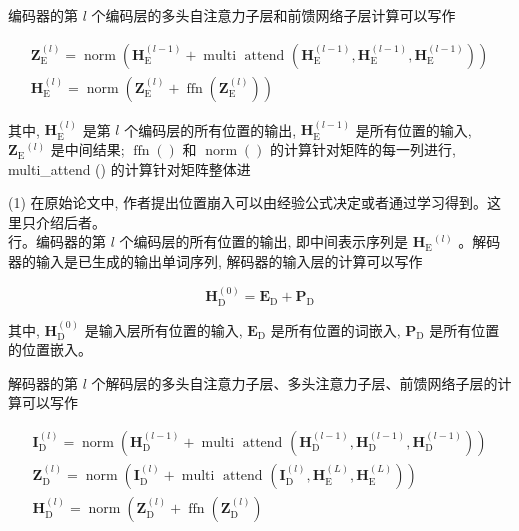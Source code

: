 \documentclass[10pt]{article}
\begin{document}
编码器的第 $l$ 个编码层的多头自注意力子层和前馈网络子层计算可以写作


\begin{gather*}
\boldsymbol{Z}_{\mathrm{E}}^{(l)}=\operatorname{norm}\left(\boldsymbol{H}_{\mathrm{E}}^{(l-1)}+\operatorname{multi} \text { attend }\left(\boldsymbol{H}_{\mathrm{E}}^{(l-1)}, \boldsymbol{H}_{\mathrm{E}}^{(l-1)}, \boldsymbol{H}_{\mathrm{E}}^{(l-1)}\right)\right)  \tag{26.32}\\
\boldsymbol{H}_{\mathrm{E}}^{(l)}=\operatorname{norm}\left(\boldsymbol{Z}_{\mathrm{E}}^{(l)}+\operatorname{ffn}\left(\boldsymbol{Z}_{\mathrm{E}}^{(l)}\right)\right) \tag{26.33}
\end{gather*}


其中, $\boldsymbol{H}_{\mathrm{E}}^{(l)}$ 是第 $l$ 个编码层的所有位置的输出, $\boldsymbol{H}_{\mathrm{E}}^{(l-1)}$ 是所有位置的输入, $\boldsymbol{Z}_{\mathrm{E}}{ }^{(l)}$ 是中间结果; $\operatorname{ffn}()$ 和 $\operatorname{norm}()$ 的计算针对矩阵的每一列进行, multi\_attend () 的计算针对矩阵整体进

(1) 在原始论文中, 作者提出位置崩入可以由经验公式决定或者通过学习得到。这里只介绍后者。\\
行。编码器的第 $l$ 个编码层的所有位置的输出, 即中间表示序列是 $\boldsymbol{H}_{\mathrm{E}}{ }^{(l)}$ 。解码器的输入是已生成的输出单词序列, 解码器的输入层的计算可以写作


\begin{equation*}
\boldsymbol{H}_{\mathrm{D}}^{(0)}=\boldsymbol{E}_{\mathrm{D}}+\boldsymbol{P}_{\mathrm{D}} \tag{26.34}
\end{equation*}


其中, $\boldsymbol{H}_{\mathrm{D}}^{(0)}$ 是输入层所有位置的输入, $\boldsymbol{E}_{\mathrm{D}}$ 是所有位置的词嵌入, $\boldsymbol{P}_{\mathrm{D}}$ 是所有位置的位置嵌入。

解码器的第 $l$ 个解码层的多头自注意力子层、多头注意力子层、前馈网络子层的计算可以写作


\begin{gather*}
\boldsymbol{I}_{\mathrm{D}}^{(l)}=\operatorname{norm}\left(\boldsymbol{H}_{\mathrm{D}}^{(l-1)}+\operatorname{multi} \text { attend }\left(\boldsymbol{H}_{\mathrm{D}}^{(l-1)}, \boldsymbol{H}_{\mathrm{D}}^{(l-1)}, \boldsymbol{H}_{\mathrm{D}}^{(l-1)}\right)\right)  \tag{26.35}\\
\boldsymbol{Z}_{\mathrm{D}}^{(l)}=\operatorname{norm}\left(\boldsymbol{I}_{\mathrm{D}}^{(l)}+\operatorname{multi} \text { attend }\left(\boldsymbol{I}_{\mathrm{D}}^{(l)}, \boldsymbol{H}_{\mathrm{E}}^{(L)}, \boldsymbol{H}_{\mathrm{E}}^{(L)}\right)\right)  \tag{26.36}\\
\boldsymbol{H}_{\mathrm{D}}^{(l)}=\operatorname{norm}\left(\boldsymbol{Z}_{\mathrm{D}}^{(l)}+\operatorname{ffn}\left(\boldsymbol{Z}_{\mathrm{D}}^{(l)}\right)\right. \tag{26.37}
\end{gather*}
\end{document}
